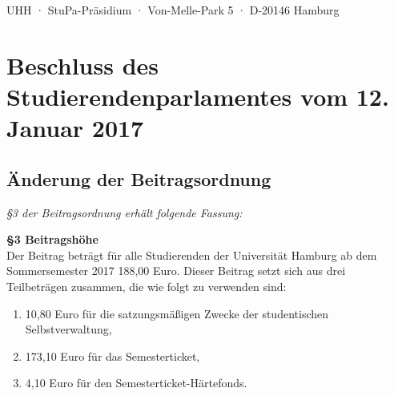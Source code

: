 \documentclass[ngerman,headheight=70pt]{scrartcl}
\renewcommand{\theenumi}{\alph{enumi})}
\begin{document}
    UHH · StuPa-Präsidium · Von-Melle-Park 5 · D-20146 Hamburg

    \section*{Beschluss des Studierendenparlamentes vom 12. Januar 2017}
    \subsection*{Änderung der Beitragsordnung}

    \textit{§3 der Beitragsordnung erhält folgende Fassung:}

    \textbf{§3 Beitragshöhe}\\
    Der Beitrag beträgt für alle Studierenden der Universität Hamburg ab dem
    Sommersemester 2017 188,00 Euro. Dieser Beitrag setzt sich aus drei
    Teilbeträgen zusammen, die wie folgt zu verwenden sind:
    \begin{enumerate}[label={\theenumi},leftmargin=*]
        \item 10,80 Euro für die satzungsmäßigen Zwecke der studentischen Selbstverwaltung,
        \item 173,10 Euro für das Semesterticket,
        \item 4,10 Euro für den Semesterticket-Härtefonds.
    \end{enumerate}
\end{document}
